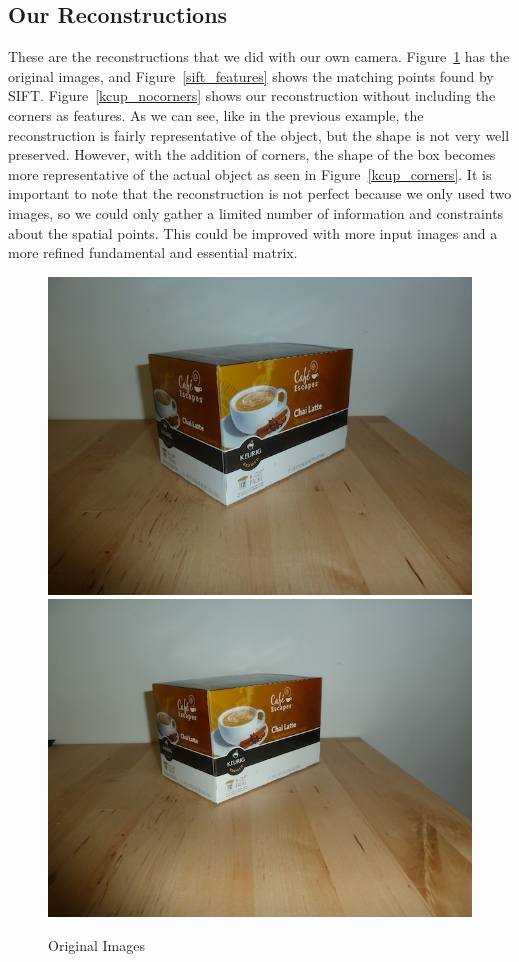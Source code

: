 \subsection{Our Reconstructions}
These are the reconstructions that we did with our own camera. Figure~\ref{original} has the original images, and Figure~\ref{sift_features} shows the matching points found by SIFT. Figure~\ref{kcup_nocorners} shows our reconstruction without including the corners as features. As we can see, like in the previous example, the reconstruction is fairly representative of the object, but the shape is not very well preserved. However, with the addition of corners, the shape of the box becomes more representative of the actual object as seen in Figure~\ref{kcup_corners}. It is important to note that the reconstruction is not perfect because we only used two images, so we could only gather a limited number of information and constraints about the spatial points. This could be improved with more input images and a more refined fundamental and essential matrix.

\begin{figure}[H]
\begin{center}
\includegraphics[width=0.45\linewidth]{figures/kcup1.jpg}
\includegraphics[width=0.45\linewidth]{figures/kcup2.jpg}
\end{center}
\caption{Original Images}
\label{original}
\end{figure}

